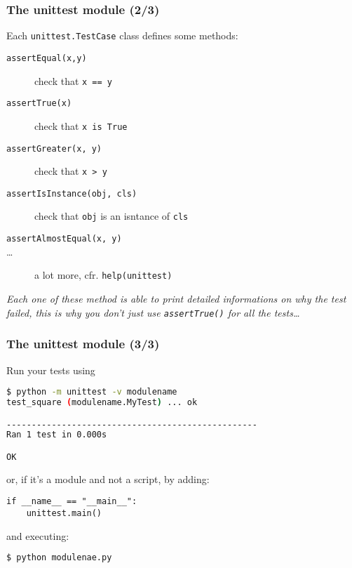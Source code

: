 \documentclass[english,serif,mathserif,xcolor=pdftex,dvipsnames,table]{beamer}
\begin{document}
\begin{frame}[fragile]
  \frametitle{The unittest module (2/3)}

  Each \lstinline|unittest.TestCase| class defines some methods:
  \begin{description}
  \item [\texttt{assertEqual(x,y)}] check that \lstinline|x == y|
  \item[\texttt{assertTrue(x)}] check that \lstinline|x is True|
  \item[\texttt{assertGreater(x, y)}] check that \lstinline|x > y|
  \item[\texttt{assertIsInstance(obj, cls)}] check that
    \lstinline|obj| is an isntance of \lstinline|cls|
  \item[\texttt{assertAlmostEqual(x, y)}]
  \item[\ldots] a lot more, cfr. \lstinline|help(unittest)|
  \end{description}

  \+
\textit{Each one of these method is able to print detailed informations on
  why the test failed, this is why you don't just use
  \texttt{assertTrue()} for all the tests\ldots}

\end{frame}

\begin{frame}[fragile]
\frametitle{The unittest module (3/3)}
Run your tests using
\+
  \begin{lstlisting}[language=sh]
$ python -m unittest -v modulename
test_square (modulename.MyTest) ... ok

--------------------------------------------------
Ran 1 test in 0.000s

OK
\end{lstlisting}

or, if it's a module and not a script, by adding:
\begin{lstlisting}
if __name__ == "__main__":
    unittest.main()
\end{lstlisting}
and executing:

\begin{lstlisting}[language=sh]
$ python modulenae.py
\end{lstlisting}%

\end{frame}
\end{document}
